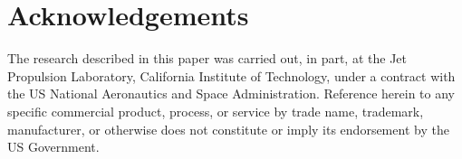 \documentclass{sig-alternate}
\begin{document}
\section*{Acknowledgements}
 The research described in this paper was carried out, in part, at the Jet
 Propulsion Laboratory, California Institute of Technology,
 under a contract with the US National Aeronautics and
 Space Administration. Reference herein to any specific
 commercial product, process, or service by trade name,
 trademark, manufacturer, or otherwise does not constitute
or imply its endorsement by the US Government.



\vspace*{0.5mm}
\small




\balance
\end{document}
